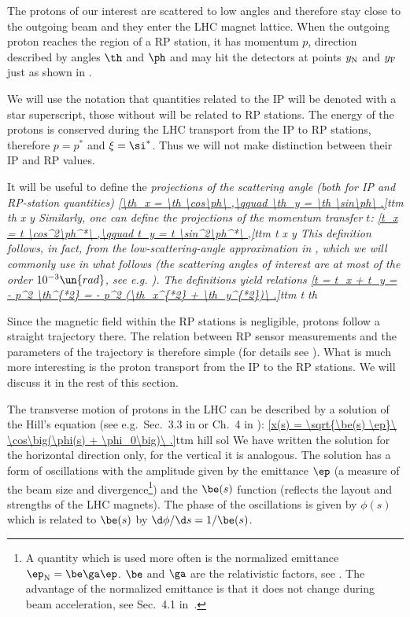 The protons of our interest are scattered to low angles and therefore stay close to the outgoing beam and they enter the LHC magnet lattice. When the outgoing proton reaches the region of a RP station, it has momentum $p$, direction described by angles $\th$ and $\ph$ and may hit the detectors at points $y_{\rm N}$ and $y_{\rm F}$ just as shown in .

We will use the notation that quantities related to the IP will be denoted with a star superscript, those without will be related to RP stations. The energy of the protons is conserved during the LHC transport from the IP to RP stations, therefore $p = p^*$ and $\xi = \si^*$. Thus we will not make distinction between their IP and RP values.

It will be useful to define the \em{projections of the scattering angle} (both for IP and RP-station quantities)
\eqref{\th_x = \th \cos\ph\ ,\qquad \th_y = \th \sin\ph\ .}{ttm th x y}
Similarly, one can define the projections of the momentum transfer $t$:
\eqref{t_x = t \cos^2\ph^*\ ,\qquad t_y = t \sin^2\ph^*\ ,}{ttm t x y}
This definition follows, in fact, from the low-scattering-angle approximation in , which we will commonly use in what follows (the scattering angles of interest are at most of the order $10^{-3}\un{rad}$, see e.g. ). The definitions  yield relations
\eqref{t = t_x + t_y = - p^2 \th^{*2} = - p^2 (\th_x^{*2} + \th_y^{*2})\ .}{ttm t th}

Since the magnetic field within the RP stations is negligible, protons follow a straight trajectory there. The relation between RP sensor measurements and the parameters of the trajectory is therefore simple (for details see ). What is much more interesting is the proton transport from the IP to the RP stations. We will discuss it in the rest of this section.

The transverse motion of protons in the LHC can be described by a solution of the Hill's equation (see e.g.~Sec.~3.3 in  or Ch.~4 in ):
\eqref{x(s) = \sqrt{\be(s) \ep}\ \cos\big(\phi(s) + \phi_0\big)\ .}{ttm hill sol}
We have written the solution for the horizontal direction only, for the vertical it is analogous. The solution has a form of oscillations with the amplitude given by the emittance $\ep$ (a measure of the beam size and divergence\footnote{%
A quantity which is used more often is the normalized emittance $\ep_{\rm N} = \be\ga \ep$. $\be$ and $\ga$ are the relativistic factors, see . The advantage of the normalized emittance is that it does not change during beam acceleration, see Sec.~4.1 in~.
}) and the $\be(s)$ function (reflects the layout and strengths of the LHC magnets). The phase of the oscillations is given by $\phi(s)$ which is related to $\be(s)$ by $\d\phi/\d s = 1/\be(s)$.

